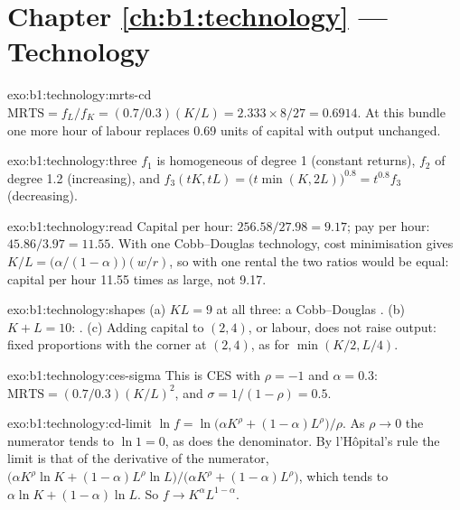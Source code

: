 \section*{Chapter \ref{ch:b1:technology} --- Technology}

\begin{solution}{exo:b1:technology:mrts-cd}
$\mathrm{MRTS} = f_L/f_K = (0.7/0.3)(K/L) = 2.333 \times 8/27 = 0.6914$. At this
bundle one more hour of labour replaces 0.69 units of capital with output
unchanged.
\end{solution}

\begin{solution}{exo:b1:technology:three}
$f_1$ is homogeneous of degree 1 (constant returns), $f_2$ of degree 1.2
(increasing), and $f_3(tK, tL) = \bigl(t\min(K, 2L)\bigr)^{0.8} = t^{0.8}f_3$ (decreasing).
\end{solution}

\begin{solution}{exo:b1:technology:read}
Capital per hour: $256.58/27.98 = 9.17$; pay per hour: $45.86/3.97 = 11.55$. With
one Cobb--Douglas technology, cost minimisation gives
$K/L = \bigl(\alpha/(1 - \alpha)\bigr)(w/r)$, so with one rental the two ratios would be
equal: capital per hour 11.55 times as large, not 9.17.
\end{solution}

\begin{solution}{exo:b1:technology:shapes}
(a) $KL = 9$ at all three: a Cobb--Douglas . (b) $K + L = 10$: . (c) Adding capital to $(2, 4)$, or labour, does not raise output:
fixed proportions with the corner at $(2, 4)$, as for $\min(K/2, L/4)$.
\end{solution}

\begin{solution}{exo:b1:technology:ces-sigma}
This is CES with $\rho = -1$ and $\alpha = 0.3$:
$\mathrm{MRTS} = (0.7/0.3)(K/L)^{2}$, and $\sigma = 1/(1 - \rho) = 0.5$.
\end{solution}

\begin{solution}{exo:b1:technology:cd-limit}
$\ln f = \ln\bigl(\alpha K^\rho + (1 - \alpha)L^\rho\bigr)/\rho$. As $\rho \to 0$ the numerator tends to
$\ln 1 = 0$, as does the denominator. By l'H\^opital's rule the limit is that of
the derivative of the numerator,
$\bigl(\alpha K^\rho\ln K + (1 - \alpha)L^\rho\ln L\bigr)/\bigl(\alpha K^\rho + (1 - \alpha)L^\rho\bigr)$, which tends
to $\alpha\ln K + (1 - \alpha)\ln L$. So $f \to K^\alpha L^{1-\alpha}$.
\end{solution}

